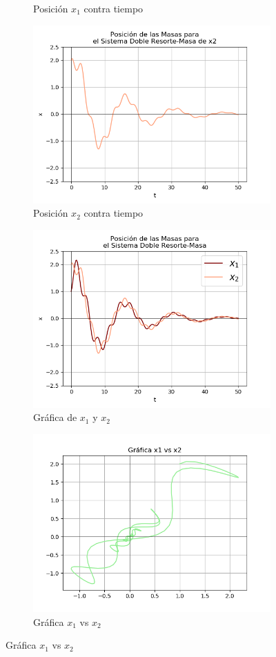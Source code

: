 \documentclass[12pt]{article}
\begin{document}
\begin{figure}[h!]
\begin{subfigure}{.55\textwidth}
  \caption{Posición $x_1$ contra tiempo}
  \label{fig:sfig2}
\end{subfigure}
\begin{subfigure}{.55\textwidth}
  \centering
  \includegraphics[width=.8\linewidth]{Ej2_44.png}
  \caption{Posición $x_2$ contra tiempo}
  \label{fig:sfig2}
\end{subfigure}
\begin{subfigure}{.55\textwidth}
  \centering
  \includegraphics[width=.8\linewidth]{Ej2_45.png}
  \caption{Gráfica de $x_1$ y $x_2$}
  \label{fig:sfig2}
\end{subfigure}
\begin{subfigure}{.55\textwidth}
  \centering
  \includegraphics[width=.8\linewidth]{Ej2_46.png}
  \caption{Gráfica $x_1$ vs $x_2$}
  \label{fig:sfig2}
\end{subfigure}
\end{figure}
\end{document}
